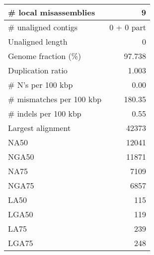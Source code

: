 \documentclass[12pt,a4paper]{article}
\begin{document}
\begin{table}[ht]
\begin{center}
\begin{tabular}{|l*{1}{|r}|}
\# local misassemblies & 9 \\ \hline
\# unaligned contigs & 0 + 0 part \\ \hline
Unaligned length & 0 \\ \hline
Genome fraction (\%) & 97.738 \\ \hline
Duplication ratio & 1.003 \\ \hline
\# N's per 100 kbp & 0.00 \\ \hline
\# mismatches per 100 kbp & 180.35 \\ \hline
\# indels per 100 kbp & 0.55 \\ \hline
Largest alignment & 42373 \\ \hline
NA50 & 12041 \\ \hline
NGA50 & 11871 \\ \hline
NA75 & 7109 \\ \hline
NGA75 & 6857 \\ \hline
LA50 & 115 \\ \hline
LGA50 & 119 \\ \hline
LA75 & 239 \\ \hline
LGA75 & 248 \\ \hline
\end{tabular}
\end{center}
\end{table}
\end{document}

